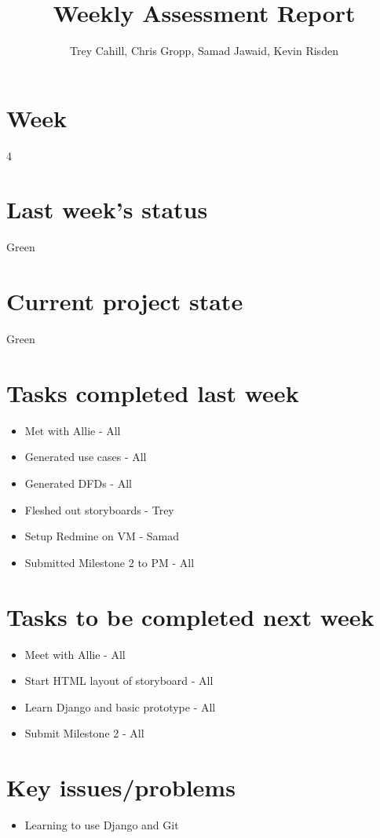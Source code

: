 \documentclass{article}
\title{Weekly Assessment Report}
\author{Trey Cahill, Chris Gropp, Samad Jawaid, Kevin Risden}
\begin{document}
\maketitle
\section{Week}
4
\section{Last week's status}
Green
\section{Current project state}
Green
\section{Tasks completed last week}
\begin{itemize}
\item Met with Allie - All
\item Generated use cases - All
\item Generated DFDs - All
\item Fleshed out storyboards - Trey
\item Setup Redmine on VM - Samad
\item Submitted Milestone 2 to PM - All
\end{itemize}
\section{Tasks to be completed next week}
\begin{itemize}
\item Meet with Allie - All
\item Start HTML layout of storyboard - All
\item Learn Django and basic prototype - All
\item Submit Milestone 2 - All
\end{itemize}
\section{Key issues/problems}
\begin{itemize}
\item Learning to use Django and Git
\end{itemize}
\end{document}
